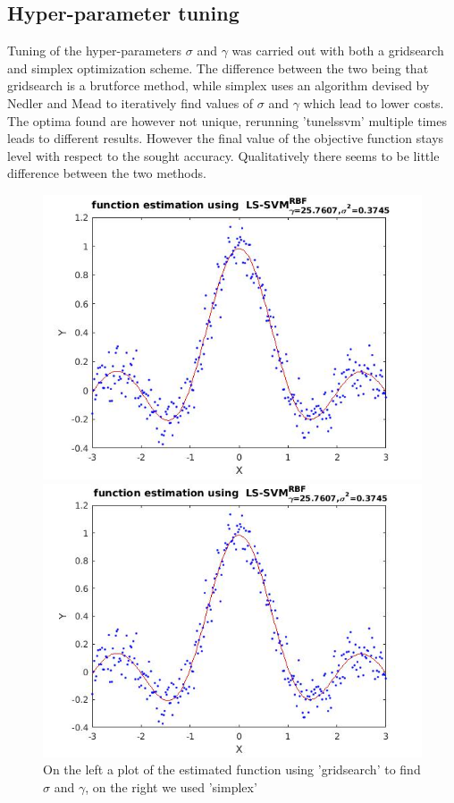 \documentclass[•]{article}
\begin{document}
\subsection{Hyper-parameter tuning}
Tuning of the hyper-parameters $\sigma$ and $\gamma$ was carried out with both a gridsearch and simplex optimization scheme. The difference between the two being that gridsearch is a brutforce method, while simplex uses an algorithm devised by Nedler and Mead to iteratively find values of $\sigma$ and $\gamma$ which lead to lower costs. The optima found are however not unique, rerunning 'tunelssvm' multiple times leads to different results. However the final value of the objective function stays level with respect to the sought accuracy. Qualitatively there seems to be little difference between the two methods. 

\begin{figure}[H]
\centering
\begin{minipage}{.45\textwidth}
\includegraphics[width=.8\textwidth]{rbfestgrid.jpg}
\end{minipage}
\begin{minipage}{.45\textwidth}
\includegraphics[width=.8\textwidth]{rbfestsimplex.jpg}
\end{minipage}
\caption{On the left a plot of the estimated function using 'gridsearch' to find  $\sigma$ and $\gamma$, on the right we used 'simplex'}
\end{figure}
\end{document}
